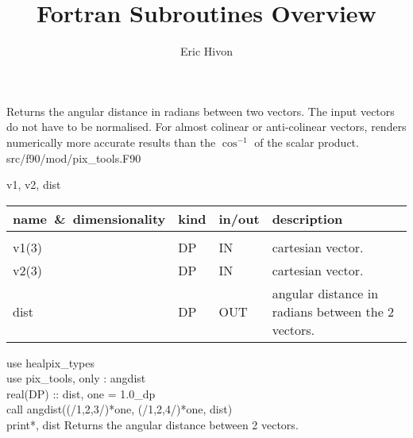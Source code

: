 
\sloppy


\title{\healpix Fortran Subroutines Overview}
 \section[angdist]{ }
\label{sub:angdist}
\author{Eric Hivon}

\begin{facility}
{Returns the angular distance in radians between two vectors. The input vectors
do not have to be normalised. For almost colinear or anti-colinear vectors, renders
numerically more accurate results than the $\cos^{-1}$ of the scalar product.} 
{src/f90/mod/pix\_tools.F90}
\end{facility}

\begin{f90format}
{v1, v2, dist}
\end{f90format}

\begin{arguments}
{
\begin{tabular}{p{0.3\hsize} p{0.05\hsize} p{0.1\hsize} p{0.45\hsize}} \hline 
\textbf{name~\&~dimensionality} & \textbf{kind} & \textbf{in/out} & \textbf{description} \\ \hline
                   &   &   &                           \\ %
v1(3) & DP & IN & cartesian vector. \\
v2(3) & DP & IN & cartesian vector. \\
dist & DP & OUT & angular distance in radians between the 2 vectors.
\end{tabular}
}
\end{arguments}

\begin{example}
{
use healpix\_types \\
use pix\_tools,    only : angdist \\
real(DP) :: dist, one = 1.0\_dp \\
call angdist((/1,2,3/)*one, (/1,2,4/)*one, dist)  \\
print*, dist
}
{
Returns the angular distance between 2 vectors.
}
\end{example}

